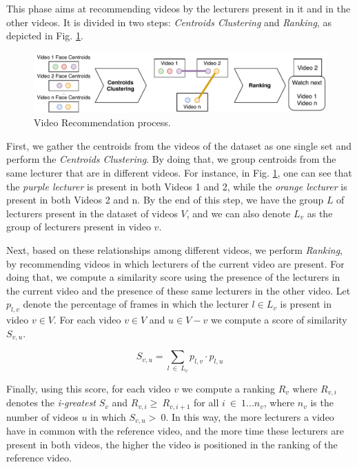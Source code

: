 This phase aims at recommending videos by the lecturers present in it and in the other videos.
It is divided in two steps: \emph{Centroids Clustering} and \emph{Ranking}, as depicted in Fig. \ref{fig:video_recommendation}.

\begin{figure}[!ht]
  \centering
  \includegraphics[width=0.8\linewidth]{img/ism/video_recommendation.pdf}
  \caption{Video Recommendation process.}
  \label{fig:video_recommendation}
\end{figure}

First, we gather the centroids from the videos of the dataset as one single set and perform the \textit{Centroids Clustering}.
By doing that, we group centroids from the same lecturer that are in different videos. For instance, in Fig. \ref{fig:video_recommendation}, one can see that the \emph{purple lecturer} is present in both Videos 1 and 2, while the \emph{orange lecturer} is present in both Videos 2 and n. By the end of this step, we have the group $L$ of lecturers present in the dataset of videos $V$, and we can also denote $L_v$ as the group of lecturers present in video $v$.

Next, based on these relationships among different videos, we perform \textit{Ranking}, by recommending videos in which lecturers of the current video are present. 
For doing that, we compute a similarity score using the presence of the lecturers in the current video and the presence of these same lecturers in the other video.
Let $p_{l,v}$ denote the percentage of frames in which the lecturer $l \in L_v$ is present in video $v \in V$. For each video $v \in V$ and $u \in V-v$ we compute a score of similarity $S_{v,u}$.

\vspace{-1em}
\begin{equation}
  S_{v,u} = \sum_{l~\in~L_v}{p_{l,v}\cdot{p_{l,u}}}
\end{equation}

Finally, using this score, for each video $v$ we compute a ranking $R_{v}$ where $R_{v,i}$ denotes the \emph{i-greatest} $S_v$ and $R_{v,i}\ge~R_{v,i+1}$ for all $i~\in~1...n_v$, where $n_v$ is the number of videos $u$ in which $S_{v,u}>~0$. 
In this way, the more lecturers a video have in common with the reference video, and the more time these lecturers are present in both videos, the higher the video is positioned in the ranking of the reference video.  

